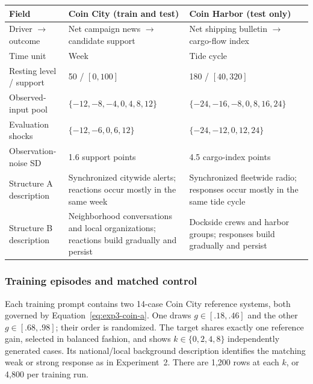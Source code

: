 \begin{center}
\begin{minipage}{\linewidth}
\centering
{}
\label{tab:exp3-domain-contrast}
\footnotesize
\setlength{\tabcolsep}{3pt}
\renewcommand{\arraystretch}{1.05}
\begin{tabular}{p{.20\linewidth}p{.36\linewidth}p{.36\linewidth}}
\toprule
\textbf{Field} & \textbf{Coin City (train and test)} & \textbf{Coin Harbor (test only)} \\
\midrule
Driver $\to$ outcome & Net campaign news $\to$ candidate support & Net shipping
bulletin $\to$ cargo-flow index \\
Time unit & Week & Tide cycle \\
Resting level / support & 50 / $[0,100]$ & 180 / $[40,320]$ \\
Observed-input pool & $\{-12,-8,-4,0,4,8,12\}$ &
$\{-24,-16,-8,0,8,16,24\}$ \\
Evaluation shocks & $\{-12,-6,0,6,12\}$ & $\{-24,-12,0,12,24\}$ \\
Observation-noise SD & 1.6 support points & 4.5 cargo-index points \\
Structure A description & Synchronized citywide alerts; reactions occur mostly in
the same week & Synchronized fleetwide radio; responses occur mostly in the same
tide cycle \\
Structure B description & Neighborhood conversations and local organizations;
reactions build gradually and persist & Dockside crews and harbor groups; responses
build gradually and persist \\
\bottomrule
\end{tabular}
\end{minipage}
\end{center}

\subsubsection{Training episodes and matched control}

Each training prompt contains two 14-case Coin City reference systems, both
governed by Equation~\ref{eq:exp3-coin-a}. One draws
$g\in[.18,.46]$ and the other $g\in[.68,.98]$; their order is randomized.
The target shares exactly one reference gain, selected in balanced fashion, and
shows $k\in\{0,2,4,8\}$ independently generated cases. Its national/local
background description identifies the matching weak or strong response as in
Experiment~2. There are 1,200 rows at each $k$, or 4,800 per training run.

